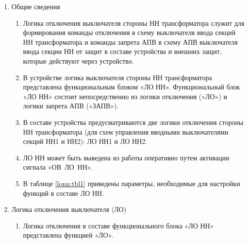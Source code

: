 
\color{black}

\begin{enumerate}


\item Общие сведения

\begin{enumerate}

\item
Логика отключения выключателя стороны НН трансформатора служит для формирования команды отключения в схему выключателя ввода секций НН трансформатора и команды запрета АПВ в схему АПВ выключателя ввода секции НН от защит в составе устройства и внешних защит, которые действуют через устройство.

\item
В устройстве логика выключателя стороны НН трансформатора представлена функциональным блоком «ЛО НН». Функциональный блок «ЛО НН» состоит непосредственно из логики отключения («ЛО») и логики запрета АПВ («ЗАПВ»).

\item 
В составе устройства предусматриваются две логики отключения стороны НН трансформатора (для схем управления вводными выключателями секций НН1 и НН2): ЛО НН1 и ЛО НН2.

\item
ЛО НН может быть выведена из работы оперативно путем активации сигнала «ОВ~ЛО~НН».
\item
В таблице \ref{lonn:tbl1} приведены параметры, необходимые для настройки функций в составе ЛО НН.


\end{enumerate}


\item Логика отключения выключателя (ЛО)

\begin{enumerate}

\item
Логика отключения в составе функционального блока «ЛО НН» представлена функцией «ЛО».


\end{enumerate}
\end{enumerate}
